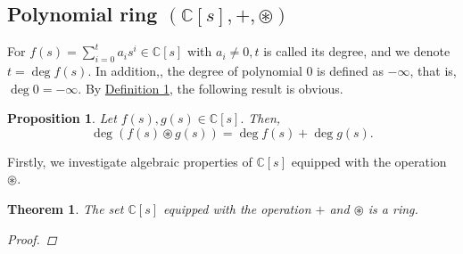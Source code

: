 \documentclass[12pt,a4paper,fleqn,twoside]{article}
\newtheorem{proposition}{Proposition}
\theoremstyle{plain}
\newtheorem{theorem}{Theorem}
\begin{document}
	\subsection{Polynomial ring $(\mathbb{C}[s], +,\circledast)$}
		For $f(s)= \sum_{i=0}^{t} a_i s^i \in \mathbb{C}[s]$ with $a_i \neq 0, t$ is called its degree, and we denote $t= \deg f(s)$. In addition,, the degree of polynomial 0 is defined as $-\infty$, that is, $\deg 0= -\infty.$ By \hyperref[Definition 1]{Definition 1}, the following result is obvious.
	\begin{proposition}
		Let $f(s),g(s) \in \mathbb{C}[s].$ Then,
		\[\deg (f(s)\circledast g(s))=\deg f(s)+\deg g(s).\]
	\end{proposition}
	Firstly, we investigate algebraic properties of \(\mathbb{C}[s]\) equipped with the operation $\circledast$.
	\begin{theorem}
		The set \(\mathbb{C}[s]\) equipped with the operation $+$ and $\circledast $ is a ring.
		\begin{proof}
			

\end{proof}
\end{theorem}
\end{document}
